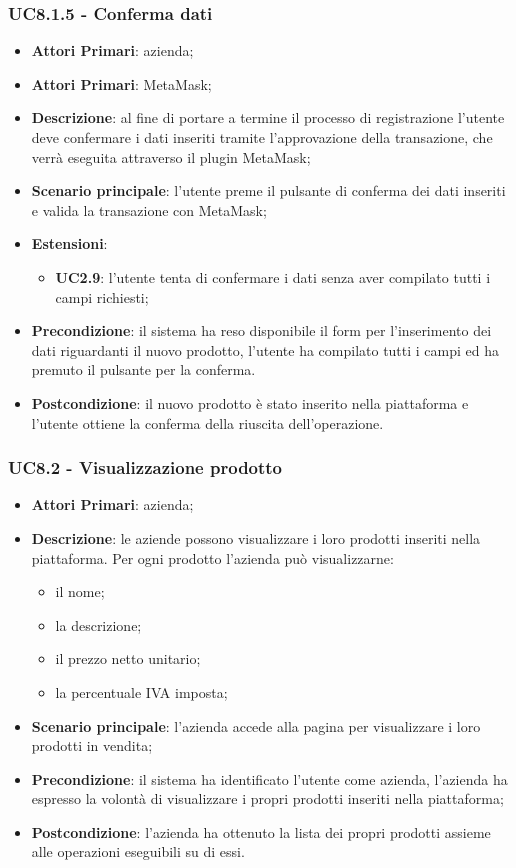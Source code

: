 \subsubsection{UC8.1.5 - Conferma dati}
\begin{itemize}
	\item \textbf{Attori Primari}: azienda;
	\item \textbf{Attori Primari}: MetaMask\glo;
	\item \textbf{Descrizione}: al fine di portare a termine il processo di registrazione l'utente deve confermare i dati inseriti tramite l'approvazione della transazione, che verrà eseguita attraverso il plugin MetaMask\glo;
	\item \textbf{Scenario principale}: l'utente preme il pulsante di conferma dei dati inseriti e valida la transazione con MetaMask\glo;
	\item \textbf{Estensioni}:
	\begin{itemize}
		\item \textbf{UC2.9}: l'utente tenta di confermare i dati senza aver compilato tutti i campi richiesti;
	\end{itemize}
	\item \textbf{Precondizione}: il sistema ha reso disponibile il form per l'inserimento dei dati riguardanti il nuovo prodotto, l'utente ha compilato tutti i campi ed ha premuto il pulsante per la conferma.
	\item \textbf{Postcondizione}: il nuovo prodotto è stato inserito nella piattaforma e l'utente ottiene la conferma della riuscita dell'operazione.
\end{itemize}

\subsubsection{UC8.2 - Visualizzazione prodotto}
\begin{itemize}
	\item \textbf{Attori Primari}: azienda;
	\item \textbf{Descrizione}: le aziende possono visualizzare i loro prodotti inseriti nella piattaforma. Per ogni prodotto l'azienda può visualizzarne:
	\begin{itemize}
		\item il nome;
		\item la descrizione;
		\item il prezzo netto unitario;
		\item la percentuale IVA imposta;
	\end{itemize}
	\item \textbf{Scenario principale}: l'azienda accede alla pagina per visualizzare i loro prodotti in vendita;	
	\item \textbf{Precondizione}: il sistema ha identificato l'utente come azienda, l'azienda ha espresso la volontà di visualizzare i propri prodotti inseriti nella piattaforma;
	\item \textbf{Postcondizione}: l'azienda ha ottenuto la lista dei propri prodotti assieme alle operazioni eseguibili su di essi.	
\end{itemize}


